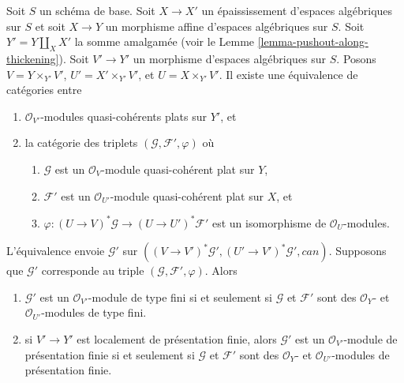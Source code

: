 \begin{lemma}
\label{lemma-space-over-pushout-flat-modules}
Soit $S$ un schéma de base.
Soit $X \to X'$ un épaississement d'espaces algébriques sur $S$
et soit $X \to Y$ un morphisme affine d'espaces algébriques sur $S$.
Soit $Y' = Y \amalg_X X'$ la somme amalgamée
(voir le Lemme \ref{lemma-pushout-along-thickening}).
Soit $V' \to Y'$ un morphisme d'espaces algébriques sur $S$. Posons
$V = Y \times_{Y'} V'$, $U' = X' \times_{Y'} V'$, et $U = X \times_{Y'} V'$.
Il existe une équivalence de catégories entre
\begin{enumerate}
\item $\mathcal{O}_{V'}$-modules quasi-cohérents plats sur $Y'$, et
\item la catégorie des triplets $(\mathcal{G}, \mathcal{F}', \varphi)$ où
\begin{enumerate}
\item $\mathcal{G}$ est un $\mathcal{O}_V$-module quasi-cohérent plat sur $Y$,
\item $\mathcal{F}'$ est un $\mathcal{O}_{U'}$-module quasi-cohérent plat
sur $X$, et
\item $\varphi : (U \to V)^*\mathcal{G} \to (U \to U')^*\mathcal{F}'$ est un isomorphisme de $\mathcal{O}_U$-modules.
\end{enumerate}
\end{enumerate}
L'équivalence envoie $\mathcal{G}'$ sur
$((V \to V')^*\mathcal{G}', (U' \to V')^*\mathcal{G}', can)$.
Supposons que $\mathcal{G}'$ corresponde au triple
$(\mathcal{G}, \mathcal{F}', \varphi)$. Alors
\begin{enumerate}
\item[(a)] $\mathcal{G}'$ est un $\mathcal{O}_{V'}$-module de type fini si et seulement si $\mathcal{G}$ et $\mathcal{F}'$ sont des $\mathcal{O}_Y$- et $\mathcal{O}_{U'}$-modules de type fini.
\item[(b)] si $V' \to Y'$ est localement de présentation finie, alors $\mathcal{G}'$ est un $\mathcal{O}_{V'}$-module de présentation finie si et seulement si $\mathcal{G}$ et $\mathcal{F}'$ sont des $\mathcal{O}_Y$- et $\mathcal{O}_{U'}$-modules de présentation finie.
\end{enumerate}
\end{lemma}

